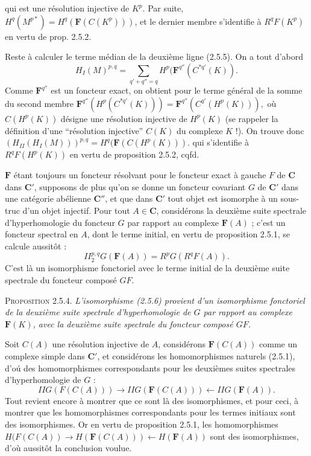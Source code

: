 
\noindent qui est une résolution injective de $K^p$. Par suite,
$H^q(M^{p*})=H^q(\mathbf F(C(K^p)))$, et le dernier membre s'identifie à
$R^qF(K^p)$ en vertu de prop. 2.5.2.

Reste à calculer le terme médian de la deuxième ligne (2.5.5). On a tout
d'abord
\[
H_I(M)^{p,q}
=\sum_{q'+q''=q}H^p(\mathbf F^{q''}(C^{*q'}(K)).
\]
Comme $\mathbf F^{q''}$ est un foncteur exact, on obtient pour le terme
général de la somme du second membre
$\mathbf F^{q''}(H^p(C^{*q'}(K)))
=\mathbf F^{q''}(C^{q'}(H^p(K))),$
où $C(H^p(K))$ désigne une résolution injective de $H^p(K)$ (se rappeler la
définition d'une ``résolution injective'' $C(K)$ du complexe $K$ !). On
trouve donc
$(H_{II}(H_I(M)))^{p,q}
=H^q(\mathbf F(C(H^p(K))).$
qui s'identifie à $R^qF(H^p(K))$ en vertu de proposition 2.5.2, cqfd.

$\mathbf F$ étant toujours un foncteur résolvant pour le foncteur exact à
gauche $F$ de $\mathbf C$ dans $\mathbf C'$, supposons de plus qu'on se donne un foncteur
covariant $G$ de $\mathbf C'$ dans une catégorie abélienne $\mathbf C''$, et que dans $\mathbf C'$
tout objet est isomorphe à un sous-truc d'un objet injectif. Pour tout
$A\in \mathbf C$, considérons la deuxième suite spectrale d'hyperhomologie du
foncteur $G$ par rapport au complexe $\mathbf F(A)$ ; c'est un foncteur
spectral en $A$, dont le terme initial, en vertu de proposition 2.5.1, se
calcule aussitôt :
\[
\tag{2.5.6}
II_2^{p,q}G(\mathbf F(A))=R^pG(R^qF(A)).
\]
C'est là un isomorphisme fonctoriel avec le terme initial de la deuxième suite
spectrale du foncteur composé $GF$.

\textsc{Proposition 2.5.4.} \textit{L'isomorphisme \textup{(2.5.6)}
provient d'un isomorphisme fonctoriel de la deuxième suite spectrale
d'hyperhomologie de $G$ par rapport au complexe $\mathbf F(K)$, avec la
deuxième suite spectrale du foncteur composé $GF$.}

Soit $C(A)$ une résolution injective de $A$, considérons $\mathbf F(C(A))$ comme un
complexe simple dans $\mathbf C'$, et considérons les homomorphismes naturels (2.5.1),
d'oú des homomorphismes correspondants pour les deuxièmes suites spectrales
d'hyperhomologie de $G$ :
\[
IIG(F(C(A)))\to IIG(\mathbf F(C(A)))
\leftarrow IIG(\mathbf F(A)).
\]
Tout revient encore à montrer que ce sont là des isomorphismes, et pour ceci,
à montrer que les homomorphismes correspondants pour les termes initiaux sont
des isomorphismes. Or en vertu de proposition 2.5.1, les homomorphismes
$H(F(C(A))\to H(\mathbf F(C(A)))\leftarrow H(\mathbf F(A))$
sont des isomorphismes, d'où aussitôt la conclusion voulue.

